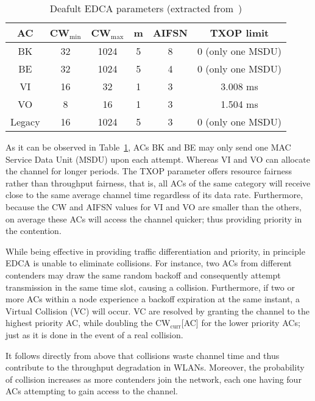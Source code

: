 \documentclass[a4paper]{article}
\begin{document}
	\begin{table}[t]
		\centering
		\caption{Deafult EDCA parameters (extracted from~\cite{perahia2013next})}
		\label{tab:EDCAparams}
		\begin{tabular}{|c|c|c|c|c|c|}
			\hline
			{\bfseries AC} & {\bfseries CW$_{\min}$} & {\bfseries CW$_{\max}$} &		{\bfseries m}		& {\bfseries AIFSN} & {\bfseries TXOP limit}\\
			\hline
			BK 		       & 		32			&		1024		   &			5			& 		8		  &		0 (only one MSDU)\\
BE 		       & 		32			&		1024		   &			5			& 		4		  &		0 (only one MSDU)	\\
VI 		       & 		16			&		32		  	   &			1			& 		3		  &		3.008 ms		\\
VO 		       & 		8			&		16		  	   &			1			& 		3		  &		1.504 ms		\\
Legacy	       & 		16			&		1024	  	   &			5			& 		3		  &		0 (only one MSDU)\\
			\hline
		\end{tabular}
	\end{table}

As it can be observed in Table~\ref{tab:EDCAparams}, ACs BK and BE may only send one MAC Service Data Unit (MSDU) upon each attempt. Whereas VI and VO can allocate the channel for longer periods. The TXOP parameter offers resource fairness rather than throughput fairness, that is, all ACs of the same category will receive close to the same average channel time regardless of its data rate. Furthermore, because the CW and AIFSN values for VI and VO are smaller than the others, on average these ACs will access the channel quicker; thus providing priority in the contention. 



While being effective in providing traffic differentiation and priority, in principle EDCA is unable to eliminate collisions. For instance, two ACs from different contenders may draw the same random backoff and consequently attempt transmission in the same time slot, causing a collision. Furthermore, if two or more ACs within a node experience a backoff expiration at the same instant, a Virtual Collision (VC) will occur. VC are resolved by granting the channel to the highest priority AC, while doubling the CW$_{\text{curr}}$[AC] for the lower priority ACs; just as it is done in the event of a real collision.

It follows directly from above that collisions waste channel time and thus contribute to the throughput degradation in WLANs. Moreover, the probability of collision increases as more contenders join the network, each one having four ACs attempting to gain access to the channel.
\end{document}
